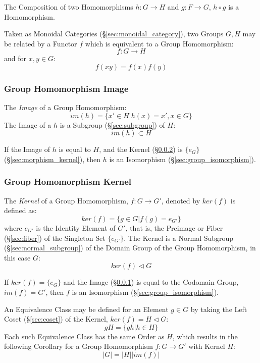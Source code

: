 The Composition of two Homomorphisms $h : G \rightarrow H$ and $g : F
\rightarrow G$, $h \circ g$ is a Homomorphism.

Taken as Monoidal Categories (\S\ref{sec:monoidal_category}), two
Groups $G, H$ may be related by a Functor $f$ which is equivalent to a
Group Homomorphism:
\[
    f : G \rightarrow H
\]
and for $x,y \in G$:
\[
    f(xy) = f(x)f(y)
\]



\subsubsection{Group Homomorphism Image}\label{sec:group_image}

The \emph{Image} of a Group Homomorphism:
\[
    im(h) = \{ x' \in H | h(x) = x', x \in G \}
\]
The Image of a $h$ is a Subgroup (\S\ref{sec:subgroup}) of $H$:
\[
    im(h) \subset H
\]

If the Image of $h$ is equal to $H$, and the Kernel
(\S\ref{sec:group_kernel}) is $\{e_G\}$ (\S\ref{sec:morphism_kernel}),
then $h$ is an Isomorphism (\S\ref{sec:group_isomorphism}).



\subsubsection{Group Homomorphism Kernel}\label{sec:group_kernel}

The \emph{Kernel} of a Group Homomorphism, $f : G \rightarrow G'$,
denoted by $ker(f)$ is defined as:
\[
    ker(f) = \{g \in G | f(g) = e_{G'}\}
\]
where $e_{G'}$ is the Identity Element of $G'$, that is, the Preimage
or Fiber (\S\ref{sec:fiber}) of the Singleton Set $\{e_{G'}\}$. The
Kernel is a Normal Subgroup (\S\ref{sec:normal_subgroup}) of the
Domain Group of the Group Homomorphism, in this case $G$:
\[
    ker(f) \triangleleft G
\]

If $ker(f) = \{e_G\}$ and the Image (\S\ref{sec:group_image}) is equal
to the Codomain Group, $im(f) = G'$, then $f$ is an Isomorphism
(\S\ref{sec:group_isomorphism}).

An Equivalence Class may be defined for an Element $g \in G$ by taking
the Left Coset (\S\ref{sec:coset}) of the Kernel, $ker(f) = H
\triangleleft G$:
\[
    gH = \{ gh | h \in H \}
\]
Each such Equivalence Class has the same Order as $H$, which results
in the following Corollary for a Group Homomorphism $f : G \rightarrow
G'$ with Kernel $H$:
\[
    |G| = |H||im(f)|
\]




